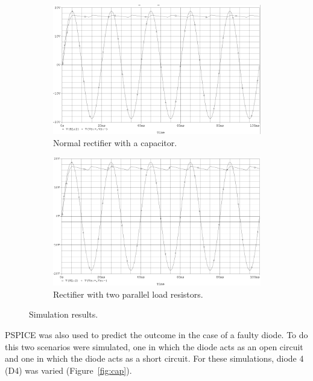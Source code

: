 \documentclass[12pt]{article}
\begin{document}
\begin{figure}[h!]
\centering
\begin{subfigure}[b]{0.65\textwidth}
\includegraphics[width=\textwidth]{out_norm}
\caption{Normal rectifier with a capacitor.}
\label{fig:norm}
\end{subfigure}
\qquad
\begin{subfigure}[b]{0.65\textwidth}
\includegraphics[width=\textwidth]{out_res}
\caption{Rectifier with two parallel load resistors.}
\label{fig:res}
\end{subfigure}
\caption{Simulation results.}
\label{fig:sim}
\end{figure}

PSPICE was also used to predict the outcome in the case of a faulty diode. To do this two scenarios were simulated, one in which the diode acts as an open circuit and one in which the diode acts as a short circuit. For these simulations, diode 4 (D4) was varied (Figure~\ref{fig:cap}).
\end{document}
